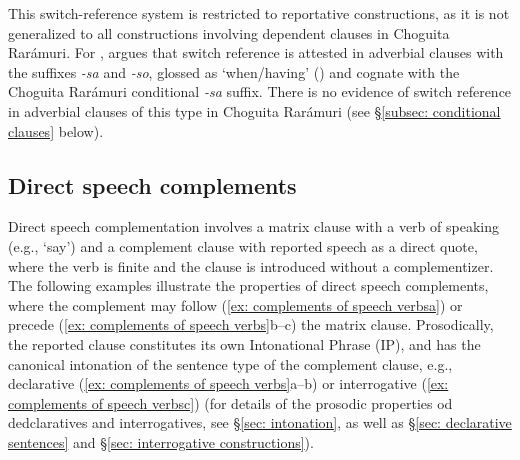 This switch-reference system is restricted to reportative constructions, as it is not generalized to all constructions involving dependent clauses in Choguita Rarámuri. For , \citet{Burgess-1984} argues that switch reference is attested in adverbial clauses with the suffixes \textit{-sa} and \textit{-so}, glossed as `when/having' (\citeyear[137]{Burgess-1984}) and cognate with the Choguita Rarámuri conditional \textit{-sa} suffix. There is no evidence of switch reference in adverbial clauses of this type in Choguita Rarámuri (see §\ref{subsec: conditional clauses} below).


\subsection{Direct speech complements}
\label{subsec: complementation with speech verbs}

Direct speech complementation involves a matrix clause with a verb of speaking (e.g., `say') and a complement clause with reported speech as a direct quote, where the verb is finite and the clause is introduced without a complementizer. The following examples illustrate the properties of direct speech complements, where the complement may follow (\ref{ex: complements of speech verbsa}) or precede (\ref{ex: complements of speech verbs}b--c) the matrix clause. Prosodically, the reported clause constitutes its own Intonational Phrase (IP), and has the canonical intonation of the sentence type of the complement clause, e.g., declarative (\ref{ex: complements of speech verbs}a--b) or interrogative (\ref{ex: complements of speech verbsc}) (for details of the prosodic properties od dedclaratives and interrogatives, see §\ref{sec: intonation}, as well as §\ref{sec: declarative sentences} and §\ref{sec: interrogative constructions}).


\ea\label{ex: complements of speech verbs}

